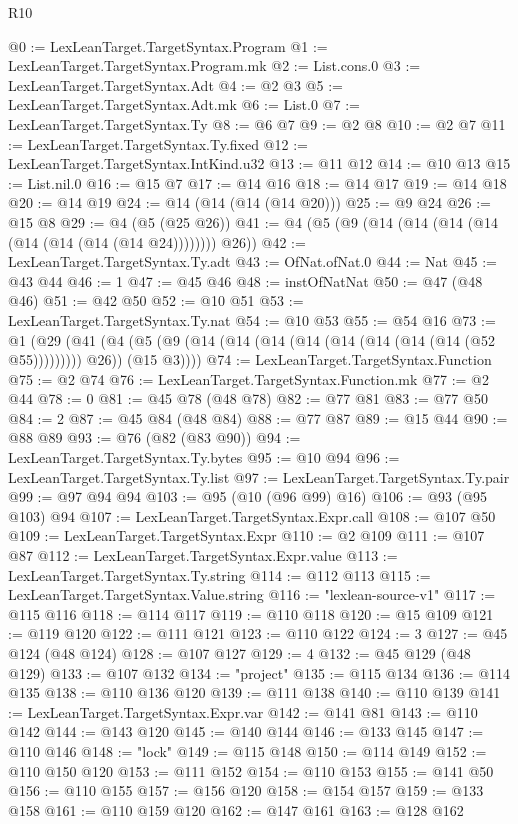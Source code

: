 \begin{lexlean}{R10}
\begin{coremodule}
@0 := LexLeanTarget.TargetSyntax.Program
@1 := LexLeanTarget.TargetSyntax.Program.mk
@2 := List.cons.{0}
@3 := LexLeanTarget.TargetSyntax.Adt
@4 := @2 @3
@5 := LexLeanTarget.TargetSyntax.Adt.mk
@6 := List.{0}
@7 := LexLeanTarget.TargetSyntax.Ty
@8 := @6 @7
@9 := @2 @8
@10 := @2 @7
@11 := LexLeanTarget.TargetSyntax.Ty.fixed
@12 := LexLeanTarget.TargetSyntax.IntKind.u32
@13 := @11 @12
@14 := @10 @13
@15 := List.nil.{0}
@16 := @15 @7
@17 := @14 @16
@18 := @14 @17
@19 := @14 @18
@20 := @14 @19
@24 := @14 (@14 (@14 (@14 @20)))
@25 := @9 @24
@26 := @15 @8
@29 := @4 (@5 (@25 @26))
@41 := @4 (@5 (@9 (@14 (@14 (@14 (@14 (@14 (@14 (@14 (@14 @24)))))))) @26))
@42 := LexLeanTarget.TargetSyntax.Ty.adt
@43 := OfNat.ofNat.{0}
@44 := Nat
@45 := @43 @44
@46 := 1
@47 := @45 @46
@48 := instOfNatNat
@50 := @47 (@48 @46)
@51 := @42 @50
@52 := @10 @51
@53 := LexLeanTarget.TargetSyntax.Ty.nat
@54 := @10 @53
@55 := @54 @16
@73 := @1
    (@29
      (@41 (@4 (@5 (@9 (@14 (@14 (@14 (@14 (@14 (@14 (@14 (@14 (@52 @55))))))))) @26)) (@15 @3))))
@74 := LexLeanTarget.TargetSyntax.Function
@75 := @2 @74
@76 := LexLeanTarget.TargetSyntax.Function.mk
@77 := @2 @44
@78 := 0
@81 := @45 @78 (@48 @78)
@82 := @77 @81
@83 := @77 @50
@84 := 2
@87 := @45 @84 (@48 @84)
@88 := @77 @87
@89 := @15 @44
@90 := @88 @89
@93 := @76 (@82 (@83 @90))
@94 := LexLeanTarget.TargetSyntax.Ty.bytes
@95 := @10 @94
@96 := LexLeanTarget.TargetSyntax.Ty.list
@97 := LexLeanTarget.TargetSyntax.Ty.pair
@99 := @97 @94 @94
@103 := @95 (@10 (@96 @99) @16)
@106 := @93 (@95 @103) @94
@107 := LexLeanTarget.TargetSyntax.Expr.call
@108 := @107 @50
@109 := LexLeanTarget.TargetSyntax.Expr
@110 := @2 @109
@111 := @107 @87
@112 := LexLeanTarget.TargetSyntax.Expr.value
@113 := LexLeanTarget.TargetSyntax.Ty.string
@114 := @112 @113
@115 := LexLeanTarget.TargetSyntax.Value.string
@116 := "lexlean-source-v1"
@117 := @115 @116
@118 := @114 @117
@119 := @110 @118
@120 := @15 @109
@121 := @119 @120
@122 := @111 @121
@123 := @110 @122
@124 := 3
@127 := @45 @124 (@48 @124)
@128 := @107 @127
@129 := 4
@132 := @45 @129 (@48 @129)
@133 := @107 @132
@134 := "project"
@135 := @115 @134
@136 := @114 @135
@138 := @110 @136 @120
@139 := @111 @138
@140 := @110 @139
@141 := LexLeanTarget.TargetSyntax.Expr.var
@142 := @141 @81
@143 := @110 @142
@144 := @143 @120
@145 := @140 @144
@146 := @133 @145
@147 := @110 @146
@148 := "lock"
@149 := @115 @148
@150 := @114 @149
@152 := @110 @150 @120
@153 := @111 @152
@154 := @110 @153
@155 := @141 @50
@156 := @110 @155
@157 := @156 @120
@158 := @154 @157
@159 := @133 @158
@161 := @110 @159 @120
@162 := @147 @161
@163 := @128 @162

\end{coremodule}
\end{lexlean}
